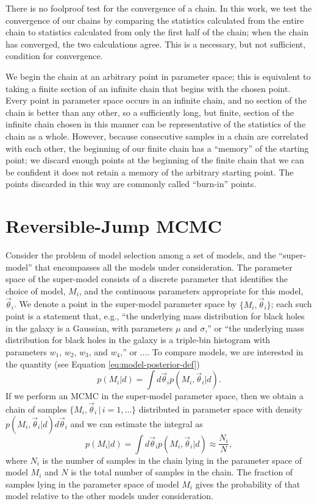 \documentclass[preprint]{aastex}
\newcommand{\vtheta}{\vec{\theta}}
\begin{document}
There is no foolproof test for the convergence of a chain.  In this
work, we test the convergence of our chains by comparing the
statistics calculated from the entire chain to statistics calculated
from only the first half of the chain; when the chain has converged,
the two calculations agree.  This is a necessary, but not sufficient,
condition for convergence.

We begin the chain at an arbitrary point in parameter space; this is
equivalent to taking a finite section of an infinite chain that begins
with the chosen point.  Every point in parameter space occurs in an
infinite chain, and no section of the chain is better than any other,
so a sufficiently long, but finite, section of the infinite chain
chosen in this manner can be representative of the statistics of the
chain as a whole.  However, because consecutive samples in a chain are
correlated with each other, the beginning of our finite chain has a
``memory'' of the starting point; we discard enough points at the
beginning of the finite chain that we can be confident it does not
retain a memory of the arbitrary starting point.  The points discarded
in this way are commonly called ``burn-in'' points.

\section{Reversible-Jump MCMC}
\label{sec:reversible-jump-mcmc}

Consider the problem of model selection among a set of models, and the
``super-model'' that encompasses all the models under consideration.
The parameter space of the super-model consists of a discrete
parameter that identifies the choice of model, $M_i$, and the
continuous parameters appropriate for this model, $\vtheta_i$.  We
denote a point in the super-model parameter space by $\{M_i,
\vtheta_i\}$; each such point is a statement that, e.g., ``the
underlying mass distribution for black holes in the galaxy is a
Gaussian, with parameters $\mu$ and $\sigma$,'' or ``the underlying
mass distribution for black holes in the galaxy is a triple-bin
histogram with parameters $w_1$, $w_2$, $w_3$, and $w_4$,'' or ....
To compare models, we are interested in the quantity (see Equation
\eqref{eq:model-posterior-def})
\begin{equation}
  p(M_i|d) = \int d\vtheta_i p(M_i, \vtheta_i|d).
\end{equation}
If we perform an MCMC in the super-model parameter space, then we
obtain a chain of samples $\{M_i, \vtheta_i \, | \, i = 1, \ldots\}$
distributed in parameter space with density $p(M_i,\vtheta_i|d)
d\vtheta_i$ and we can estimate the integral as
\begin{equation}
    p(M_i|d) = \int d\vtheta_i p(M_i, \vtheta_i|d) \approx \frac{N_i}{N},
\end{equation}
where $N_i$ is the number of samples in the chain lying in the
parameter space of model $M_i$ and $N$ is the total number of samples
in the chain.  The fraction of samples lying in the parameter space of
model $M_i$ gives the probability of that model relative to the other
models under consideration.
\end{document}
